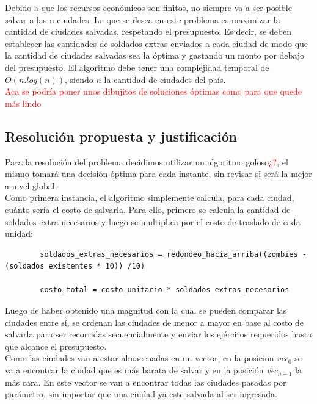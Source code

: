 \documentclass[a4paper]{article}
\begin{document}
Debido a que los recursos econ\'omicos son finitos, no siempre va a ser posible salvar a las n ciudades. Lo que se desea en este problema es maximizar la cantidad de ciudades salvadas, respetando el presupuesto. Es decir, se deben establecer las cantidades de soldados extras enviados a cada ciudad de modo que la cantidad de ciudades salvadas sea la \'optima y gastando un monto por debajo del presupuesto.  El algoritmo debe tener una complejidad temporal de $O(n.log(n))$, siendo $n$ la cantidad de ciudades del pa\'is.\\

\textcolor{red}{Aca se podr\'ia poner unos dibujitos de soluciones \'optimas como para que quede m\'as lindo}


\newpage
\subsection{Resoluci\'on propuesta y justificaci\'on}

Para la resoluci\'on del problema decidimos utilizar un algoritmo goloso\textcolor{red}{¿?}, el mismo tomar\'a una decisi\'on \'optima para cada instante, sin revisar si ser\'a la mejor a nivel global.\\

Como primera instancia, el algoritmo simplemente calcula, para cada ciudad, cu\'anto ser\'ia el costo de salvarla. Para ello, primero se calcula la cantidad de soldados extra necesarios y luego se multiplica por el costo de traslado de cada unidad:\\


	\begin{codesnippet}
	\begin{verbatim}
		soldados_extras_necesarios = redondeo_hacia_arriba((zombies - (soldados_existentes * 10)) /10)
		
		costo_total = costo_unitario * soldados_extras_necesarios
	\end{verbatim}
	\end{codesnippet}

Luego de haber obtenido una magnitud con la cual se pueden comparar las ciudades entre s\'i, se ordenan las ciudades de menor a mayor en base al costo de salvarla para ser recorridas secuencialmente y enviar los ej\'ercitos requeridos hasta que alcance el presupuesto.\\

 Como las ciudades van a estar almacenadas en un vector, en la posicion \textit{vec}$_0$ se va a encontrar la ciudad que es m\'as barata de salvar y en la posici\'on \textit{vec}$_{n-1}$ la m\'as cara. En este vector se van a encontrar todas las ciudades pasadas por par\'ametro, sin importar que una ciudad ya este salvada al ser ingresada.\\
 
\end{document}
